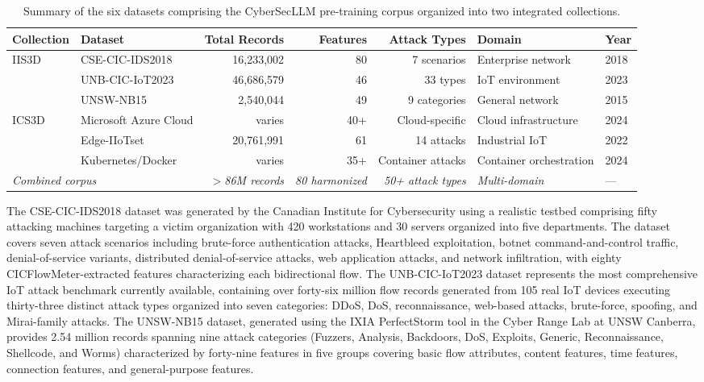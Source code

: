 \documentclass[journal]{IEEEtran}
\newcommand{\modelname}{CyberSecLLM}
\begin{document}
\begin{table}[!t]
\centering
\caption{Summary of the six datasets comprising the \modelname{} pre-training corpus organized into two integrated collections.}
\label{tab:datasets}
\renewcommand{\arraystretch}{1.15}
\begin{tabular}{llrrrll}
\toprule
\textbf{Collection} & \textbf{Dataset} & \textbf{Total Records} & \textbf{Features} & \textbf{Attack Types} & \textbf{Domain} & \textbf{Year} \\
\midrule
\multirow{3}{*}{IIS3D} & CSE-CIC-IDS2018 & 16,233,002 & 80 & 7 scenarios & Enterprise network & 2018 \\
 & UNB-CIC-IoT2023 & 46,686,579 & 46 & 33 types & IoT environment & 2023 \\
 & UNSW-NB15 & 2,540,044 & 49 & 9 categories & General network & 2015 \\
\midrule
\multirow{3}{*}{ICS3D} & Microsoft Azure Cloud & varies & 40+ & Cloud-specific & Cloud infrastructure & 2024 \\
 & Edge-IIoTset & 20,761,991 & 61 & 14 attacks & Industrial IoT & 2022 \\
 & Kubernetes/Docker & varies & 35+ & Container attacks & Container orchestration & 2024 \\
\midrule
\multicolumn{2}{l}{\textit{Combined corpus}} & \textit{$>$86M records} & \textit{80 harmonized} & \textit{50+ attack types} & \textit{Multi-domain} & --- \\
\bottomrule
\end{tabular}
\end{table}

The CSE-CIC-IDS2018 dataset was generated by the Canadian Institute for Cybersecurity using a realistic testbed comprising fifty attacking machines targeting a victim organization with 420 workstations and 30 servers organized into five departments. The dataset covers seven attack scenarios including brute-force authentication attacks, Heartbleed exploitation, botnet command-and-control traffic, denial-of-service variants, distributed denial-of-service attacks, web application attacks, and network infiltration, with eighty CICFlowMeter-extracted features characterizing each bidirectional flow. The UNB-CIC-IoT2023 dataset represents the most comprehensive IoT attack benchmark currently available, containing over forty-six million flow records generated from 105 real IoT devices executing thirty-three distinct attack types organized into seven categories: DDoS, DoS, reconnaissance, web-based attacks, brute-force, spoofing, and Mirai-family attacks. The UNSW-NB15 dataset, generated using the IXIA PerfectStorm tool in the Cyber Range Lab at UNSW Canberra, provides 2.54 million records spanning nine attack categories (Fuzzers, Analysis, Backdoors, DoS, Exploits, Generic, Reconnaissance, Shellcode, and Worms) characterized by forty-nine features in five groups covering basic flow attributes, content features, time features, connection features, and general-purpose features.
\end{document}
